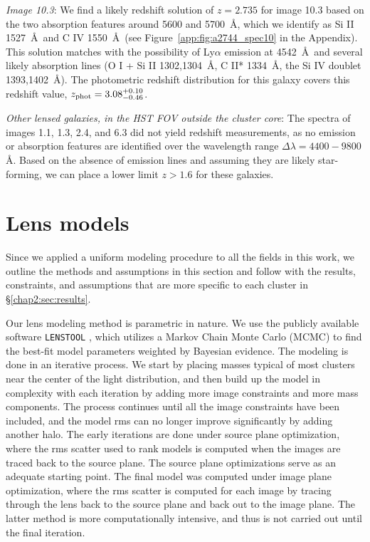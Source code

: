 \textit{Image 10.3}: We find a likely redshift solution of $z=2.735$ for image 10.3 based on the two absorption features around 5600 and 5700~\AA, which we identify as Si II 1527~\AA\ and C IV 1550~\AA\ (see Figure~\ref{app:fig:a2744_spec10} in the Appendix). This solution matches with the possibility of Ly$\alpha$ emission at 4542~\AA\  and several likely absorption lines (O I + Si II 1302,1304~\AA, C II* 1334~\AA, the Si IV doublet 1393,1402~\AA). The photometric redshift distribution for this galaxy covers this redshift value, $z_\mathrm{phot}=3.08^{+0.10}_{-0.46}$.

\textit{Other lensed galaxies, in the HST FOV outside the cluster core}: The spectra of images 1.1, 1.3, 2.4, and 6.3 did not yield redshift measurements, as no emission or absorption features are identified over the wavelength range $\Delta\lambda=4400-9800$ \AA. Based on the absence of emission lines and assuming they are likely star-forming, we can place a lower limit $z>1.6$ for these galaxies.


\section{Lens models}
\label{chap2:sec:models}
Since we applied a uniform modeling procedure to all the fields in this work, we outline the methods and assumptions in this section and follow with the results, constraints, and assumptions that are more specific to each cluster in \S \ref{chap2:sec:results}.

Our lens modeling method is parametric in nature. We use the publicly available software \texttt{LENSTOOL} \citep{Jullo:2007lr}, which utilizes a Markov Chain Monte Carlo (MCMC) to find the best-fit model parameters weighted by Bayesian evidence. The modeling is done in an iterative process. We start by placing masses typical of most clusters near the center of the light distribution, and then build up the model in complexity with each iteration by adding more image constraints and more mass components. The process continues until all the image constraints  have been included, and the model rms can no longer improve significantly by adding another halo. The early iterations are done under source plane optimization, where the rms scatter used to rank models is computed when the images are traced back to the source plane. The source plane optimizations serve as an adequate starting point. The final model was computed under image plane optimization, where the rms scatter is computed for each image by tracing through the lens back to the source plane and back out to the image plane. The latter method is more computationally intensive, and thus is not carried out until the final iteration.

